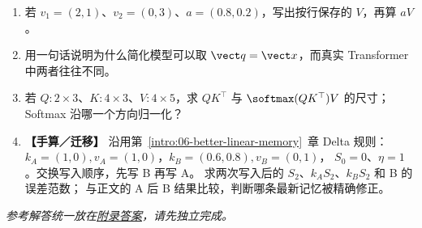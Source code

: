 \begin{enumerate}[label=\textbf{C3-\arabic*.}]
\item {}\label{exercise:C3-9}   若 $v_1=(2,1)$、$v_2=(0,3)$、$a=(0.8,0.2)$，写出按行保存的 $V$，再算 $aV$。
\item {}\label{exercise:C3-10}   用一句话说明为什么简化模型可以取 $\vect q=\vect x$，而真实 Transformer 中两者往往不同。
\item {}\label{exercise:C3-11}   若 $Q:2\times3$、$K:4\times3$、$V:4\times5$，求 $QK^\top$ 与 $\softmax(QK^\top)V$ 的尺寸；Softmax 沿哪一个方向归一化？
\item {}\label{exercise:C3-12}  \label{exercise:delta-reverse}
\textbf{【手算／迁移】} 沿用第~\ref*{intro:06-better-linear-memory}~章 Delta 规则：
$k_A=(1,0),v_A=(1,0)$，$k_B=(0.6,0.8),v_B=(0,1)$，
$S_0=0$、$\eta=1$。交换写入顺序，先写 B 再写 A。
求两次写入后的 $S_2$、$k_AS_2$、$k_BS_2$ 和 B 的误差范数；
与正文的 A 后 B 结果比较，判断哪条最新记忆被精确修正。
\end{enumerate}

\noindent\emph{参考解答统一放在\hyperref[app:answers]{附录答案}，请先独立完成。}

